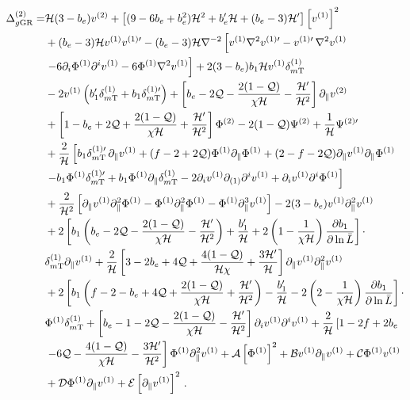 \begin{align} \label{eq:DeltaSOwBGcoeffs}
	\Delta_{g\mathrm{GR}}^{(2)} =& \mathcal{H} (3-b_e) v^{(2)} + \left[ ( 9 - 6 b_e + b_e^2 ) \mathcal{H}^2 + b_e'\mathcal{H} + ( b_e - 3) \mathcal{H}' \right] \left[ v^{(1)} \right]^2 \nonumber \\
	&+ (b_e - 3) \mathcal{H} v^{(1)} {v^{(1)\prime}} - (b_e - 3) \mathcal{H} \nabla^{-2} \left[ v^{(1)} \nabla^2 v^{(1)\prime} - v^{(1)\prime} \, \nabla^2 v^{(1)}  \right. \nonumber \\
	&\left. - 6\partial_{i}\Phi^{(1)} \partial^i v^{(1)} - 6\Phi^{(1)} \nabla^2 v^{(1)} \right] + 2 (3 - b_e) b_1 \mathcal{H} v^{(1)} \delta_{m\mathrm{T}}^{(1)}  \nonumber \\
	& - 2 v^{(1)} \left( b_1' \delta_{m\mathrm{T}}^{(1)} + b_1 \delta_{m\mathrm{T}}^{(1)\prime} \right) + \left[ b_e - 2 \mathcal{Q} - \frac{2 (1 - \mathcal{Q})}{\chi\mathcal{H}} - \frac{\mathcal{H}'}{\mathcal{H}^2} \right] \partial_\parallel v^{(2)} \nonumber \\
	&+ \left[ 1-b_e + 2 \mathcal{Q} + \frac{ 2 (1 - \mathcal{Q})}{\chi\mathcal{H}} + \frac{\mathcal{H}'}{\mathcal{H}^{2}} \right] \Phi^{(2)} - 2 (1 - \mathcal{Q}) \Psi^{(2)} + \frac{1}{\mathcal{H}}{\Psi^{(2)\prime}} \nonumber \\
	&+ \frac{2}{\mathcal{H}}\left[ b_1 {\delta_{m\mathrm{T}}^{(1)\prime}} \, \partial_\parallel v^{(1)} + (f - 2 + 2\mathcal{Q} ) \Phi^{(1)} \partial_\parallel \Phi^{(1)} + (2 - f - 2\mathcal{Q}) \partial_\parallel v^{(1)} \partial_\parallel \Phi^{(1)} \right. \nonumber \\
	&\left. - b_1 \Phi^{(1)} {\delta_{m\mathrm{T}}^{(1)\prime}} + b_1 \Phi^{(1)} \partial_\parallel \delta_{m\mathrm{T}}^{(1)} - 2\partial_i v^{(1)} \partial_{(1)} \partial^i v^{(1)} + \partial_i v^{(1)} \partial^i \Phi^{(1)} \right] \nonumber \\
	& + \frac{2}{\mathcal{H}^2} \left[ \partial_\parallel v^{(1)} \partial_\parallel^2 \Phi^{(1)} - \Phi^{(1)} \partial_\parallel^2 \Phi^{(1)} - \Phi^{(1)} \partial_\parallel^3 v^{(1)} \right] - 2 (3-b_e) v^{(1)} \partial_\parallel^2 v^{(1)} \nonumber \\
	&+ 2\left[ b_1 \left(b_e - 2\mathcal{Q} - \frac{2 (1 - \mathcal{Q})}{\chi\mathcal{H}} - \frac{\mathcal{H}'}{\mathcal{H}^2} \right) + \frac{b_1'}{\mathcal{H}} + 2\left(1 - \frac{1}{\chi\mathcal{H}} \right) \frac{\partial b_1}{\partial \ln{\bar{L}}} \right] \cdot \nonumber \\
	& \delta_{m\mathrm{T}}^{(1)} \partial_\parallel v^{(1)} + \frac{2}{\mathcal{H}} \left[ 3 - 2 b_e + 4 \mathcal{Q} + \frac{4 (1 - \mathcal{Q})}{\mathcal{H}\chi} + \frac{3\mathcal{H}'}{\mathcal{H}} \right] \partial_\parallel v^{(1)} \partial_\parallel^2 v^{(1)} \nonumber \\
	& + 2\left[ b_1 \left( f - 2 - b_e + 4 \mathcal{Q} + \frac{2 (1 - \mathcal{Q})}{\chi\mathcal{H}} + \frac{\mathcal{H}'}{\mathcal{H}^2} \right) - \frac{b_1'}{\mathcal{H}} - 2 \left( 2 - \frac{1}{\chi\mathcal{H}} \right) \frac{\partial b_1}{\partial \ln{\bar{L}}} \right] \cdot \nonumber \\
	& \Phi^{(1)} \delta_{m\mathrm{T}}^{(1)} + \left[b_e - 1 - 2\mathcal{Q} - \frac{2 (1 - \mathcal{Q})}{\chi\mathcal{H}} - \frac{\mathcal{H}'}{\mathcal{H}^{2}}\right] \partial_i v^{(1)} \partial^i v^{(1)} + \frac{2}{\mathcal{H}} \left[1 - 2f + 2b_e \right. \nonumber \\
	& \left. - 6\mathcal{Q} - \frac{4 (1 - \mathcal{Q})}{\chi\mathcal{H}} - \frac{3\mathcal{H}'}{\mathcal{H}^{2}} \right] \Phi^{(1)} \partial_\parallel^2 v^{(1)} + \mathcal{A} \left[ \Phi^{(1)} \right]^2 + \mathcal{B} v^{(1)} \partial_\parallel v^{(1)} + \mathcal{C}\Phi^{(1)} v^{(1)} \nonumber \\
	&+ \mathcal{D} \Phi^{(1)} \partial_\parallel v^{(1)} + \mathcal{E} \left[ \partial_\parallel v^{(1)} \right]^{2}\,.
\end{align}
